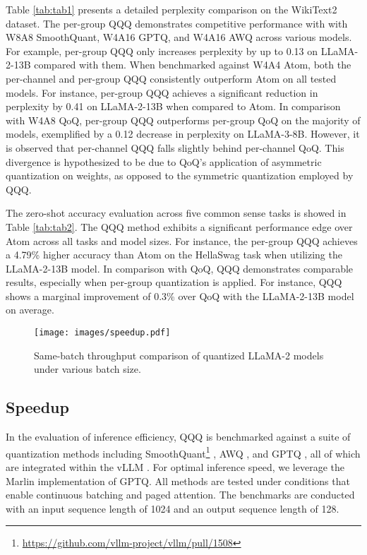 Table \ref{tab:tab1} presents a detailed perplexity comparison on the WikiText2 dataset. The per-group QQQ demonstrates competitive performance with with W8A8 SmoothQuant, W4A16 GPTQ, and W4A16 AWQ across various models. For example, per-group QQQ only increases perplexity by up to 0.13 on LLaMA-2-13B compared with them. When benchmarked against W4A4 Atom, both the per-channel and per-group QQQ consistently outperform Atom on all tested models. For instance, per-group QQQ achieves a significant reduction in perplexity by 0.41 on LLaMA-2-13B when compared to Atom. In comparison with W4A8 QoQ, per-group QQQ outperforms per-group QoQ on the majority of models, exemplified by a 0.12 decrease in perplexity on LLaMA-3-8B. However, it is observed that per-channel QQQ falls slightly behind per-channel QoQ. This divergence is hypothesized to be due to QoQ's application of asymmetric quantization on weights, as opposed to the symmetric quantization employed by QQQ.

The zero-shot accuracy evaluation across five common sense tasks is showed in Table \ref{tab:tab2}. The QQQ method exhibits a significant performance edge over Atom across all tasks and model sizes. For instance, the per-group QQQ achieves a 4.79\% higher accuracy than Atom on the HellaSwag task when utilizing the LLaMA-2-13B model. In comparison with QoQ, QQQ demonstrates comparable results, especially when per-group quantization is applied. For instance, QQQ shows a marginal improvement of 0.3\% over QoQ with the LLaMA-2-13B model on average.

\begin{figure*}[ht]
\centering
\texttt{[image: images/speedup.pdf]}
\caption{Same-batch throughput comparison of quantized LLaMA-2 models under various batch size.}
\label{fig:fig7}
\vspace{-0.1in}
\end{figure*}

\subsection{Speedup}
In the evaluation of inference efficiency, QQQ is benchmarked against a suite of quantization methods including SmoothQuant\footnote{\url{https://github.com/vllm-project/vllm/pull/1508}} \citep{xiao2023smoothquant}, AWQ \citep{lin2023awq}, and GPTQ \citep{frantar2022gptq}, all of which are integrated within the vLLM \citep{kwon2023efficient}. For optimal inference speed, we leverage the Marlin \citep{frantar2024marlin} implementation of GPTQ. All methods are tested under conditions that enable continuous batching and paged attention. The benchmarks are conducted with an input sequence length of 1024 and an output sequence length of 128.


